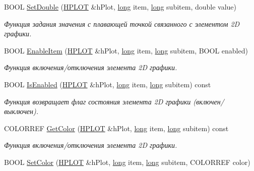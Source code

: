 \begin{DoxyCompactItemize}
\item 
B\-O\-O\-L \hyperlink{group__gr_elements_gada6cc7904e60ca04d109118293b01265}{Set\-Double} (\hyperlink{classxyplot_1_1_h_p_l_o_t}{H\-P\-L\-O\-T} \&h\-Plot, \hyperlink{namespacexyplot_a27bc71b0bdfac09495e7e531d8a918c5}{long} item, \hyperlink{namespacexyplot_a27bc71b0bdfac09495e7e531d8a918c5}{long} subitem, double value)
\begin{DoxyCompactList}\small\item\em Функция задания значения с плавающей точкой связанного с элементом 2\-D графики. \end{DoxyCompactList}\item 
B\-O\-O\-L \hyperlink{group__gr_elements_ga760b95b60afd9044a598128f49d475e8}{Enable\-Item} (\hyperlink{classxyplot_1_1_h_p_l_o_t}{H\-P\-L\-O\-T} \&h\-Plot, \hyperlink{namespacexyplot_a27bc71b0bdfac09495e7e531d8a918c5}{long} item, \hyperlink{namespacexyplot_a27bc71b0bdfac09495e7e531d8a918c5}{long} subitem, B\-O\-O\-L enabled)
\begin{DoxyCompactList}\small\item\em Функция включения/отключения элемента 2\-D графики. \end{DoxyCompactList}\item 
B\-O\-O\-L \hyperlink{group__gr_elements_ga46fa280afeab028fa4e2e71d574648da}{Is\-Enabled} (\hyperlink{classxyplot_1_1_h_p_l_o_t}{H\-P\-L\-O\-T} \&h\-Plot, \hyperlink{namespacexyplot_a27bc71b0bdfac09495e7e531d8a918c5}{long} item, \hyperlink{namespacexyplot_a27bc71b0bdfac09495e7e531d8a918c5}{long} subitem) const 
\begin{DoxyCompactList}\small\item\em Функция возвращает флаг состояния элемента 2\-D графики (включен/выключен). \end{DoxyCompactList}\item 
C\-O\-L\-O\-R\-R\-E\-F \hyperlink{group__gr_elements_ga19d975aa81ed28631a89cb6cfabf80a1}{Get\-Color} (\hyperlink{classxyplot_1_1_h_p_l_o_t}{H\-P\-L\-O\-T} \&h\-Plot, \hyperlink{namespacexyplot_a27bc71b0bdfac09495e7e531d8a918c5}{long} item, \hyperlink{namespacexyplot_a27bc71b0bdfac09495e7e531d8a918c5}{long} subitem) const 
\begin{DoxyCompactList}\small\item\em Функция включения/отключения элемента 2\-D графики. \end{DoxyCompactList}\item 
B\-O\-O\-L \hyperlink{group__gr_elements_gaea19b965d3f247481ccb5090901d9b33}{Set\-Color} (\hyperlink{classxyplot_1_1_h_p_l_o_t}{H\-P\-L\-O\-T} \&h\-Plot, \hyperlink{namespacexyplot_a27bc71b0bdfac09495e7e531d8a918c5}{long} item, \hyperlink{namespacexyplot_a27bc71b0bdfac09495e7e531d8a918c5}{long} subitem, C\-O\-L\-O\-R\-R\-E\-F color)

\end{DoxyCompactItemize}

